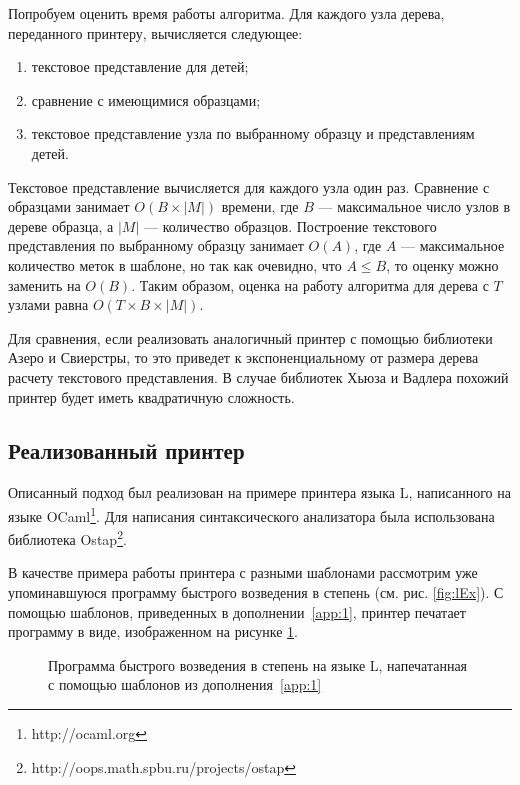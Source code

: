 Попробуем оценить время работы алгоритма. Для каждого узла дерева, переданного принтеру, вычисляется следующее:
\begin{enumerate}
	\item текстовое представление для детей;
	\item сравнение с имеющимися образцами;
	\item текстовое представление узла по выбранному образцу и представлениям детей.
\end{enumerate}

Текстовое представление вычисляется для каждого узла один раз. Сравнение с образцами занимает $O(B \times |M|)$ времени, где $B$ --- максимальное число узлов в дереве образца, а $|M|$ --- количество образцов. Построение текстового представления по выбранному образцу занимает $O(A)$, где $A$ --- максимальное количество меток в шаблоне, но так как очевидно, что $A \leq B$, то оценку можно заменить на $O(B)$. Таким образом, оценка на работу алгоритма для дерева с $T$ узлами равна $O(T \times B \times |M|)$.

Для сравнения, если реализовать аналогичный принтер с помощью библиотеки Азеро и Свиерстры, то это приведет к экспоненциальному от размера дерева расчету текстового представления. В случае библиотек Хьюза и Вадлера похожий принтер будет иметь квадратичную сложность.

\newpage

\subsection{Реализованный принтер}

Описанный подход был реализован на примере принтера языка L, написанного на языке OCaml\footnote{http://ocaml.org}. Для написания синтаксического анализатора была использована библиотека Ostap\footnote{http://oops.math.spbu.ru/projects/ostap}.

В качестве примера работы принтера с разными шаблонами рассмотрим уже упоминавшуюся программу быстрого возведения в степень (см. рис. \ref{fig:lEx}).
С помощью шаблонов, приведенных в дополнении~\ref{app:1}, принтер печатает программу в виде, изображенном на рисунке \ref{fig:firstTemplatePow}.

\begin{figure}[h!]
	
	\caption{Программа быстрого возведения в степень на языке L, напечатанная с помощью шаблонов из дополнения~\ref{app:1}}
	\label{fig:firstTemplatePow}
\end{figure}

